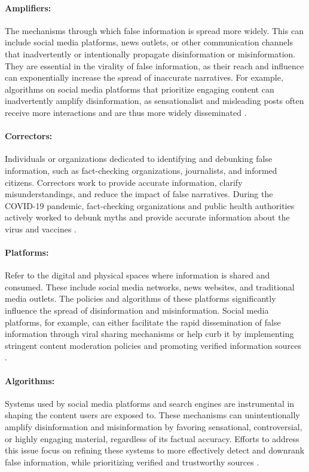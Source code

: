 \documentclass{Configuration_Files/PoliMi3i_thesis}
\begin{document}
\paragraph{Amplifiers:} The mechanisms through which false information is spread more widely. This can include social media platforms, news outlets, or other communication channels that inadvertently or intentionally propagate disinformation or misinformation. They are essential in the virality of false information, as their reach and influence can exponentially increase the spread of inaccurate narratives. For example, algorithms on social media platforms that prioritize engaging content can inadvertently amplify disinformation, as sensationalist and misleading posts often receive more interactions and are thus more widely disseminated \cite{lazer2018science, cinelli2021echo}.

\paragraph{Correctors:} Individuals or organizations dedicated to identifying and debunking false information, such as fact-checking organizations, journalists, and informed citizens. Correctors work to provide accurate information, clarify misunderstandings, and reduce the impact of false narratives. During the COVID-19 pandemic, fact-checking organizations and public health authorities actively worked to debunk myths and provide accurate information about the virus and vaccines \cite{lazer2018science}.

\paragraph{Platforms:} Refer to the digital and physical spaces where information is shared and consumed. These include social media networks, news websites, and traditional media outlets. The policies and algorithms of these platforms significantly influence the spread of disinformation and misinformation. Social media platforms, for example, can either facilitate the rapid dissemination of false information through viral sharing mechanisms or help curb it by implementing stringent content moderation policies and promoting verified information sources \cite{gillespie2018custodians}.

\paragraph{Algorithms:} Systems used by social media platforms and search engines are instrumental in shaping the content users are exposed to. These mechanisms can unintentionally amplify disinformation and misinformation by favoring sensational, controversial, or highly engaging material, regardless of its factual accuracy. Efforts to address this issue focus on refining these systems to more effectively detect and downrank false information, while prioritizing verified and trustworthy sources \cite{gillespie2018custodians, shao2017spread}.
\end{document}
